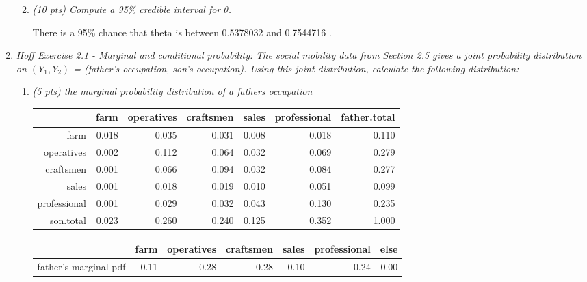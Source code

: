 \documentclass{article}\usepackage[]{graphicx}\usepackage[]{color}
\newenvironment{knitrout}{}{} %
\begin{document}
\begin{enumerate}
\begin{enumerate}
\begin{center}
\begin{knitrout}
\end{knitrout}
\end{center}

\item %
{\it (10 pts) Compute a 95\% credible interval for $\theta$. }

There is a 95\% chance that theta is between 0.5378032 and 0.7544716 .

\end{enumerate}
\newpage


\item %
{\it Hoff Exercise 2.1 - Marginal and conditional probability: The social mobility data from Section 2.5 gives a joint probability distribution on $(Y_{1}, Y_{2})$ = (father's occupation, son's occupation). Using this joint distribution, calculate the following distribution:



\begin{enumerate}
\item %
{\it (5 pts) the marginal probability distribution of a father\textsc{}s occupation}

\begin{table}[ht]
\centering
\begin{tabular}{rrrrrrr}
  \hline
 & farm & operatives & craftsmen & sales & professional & father.total \\ 
  \hline
farm & 0.018 & 0.035 & 0.031 & 0.008 & 0.018 & 0.110 \\ 
  operatives & 0.002 & 0.112 & 0.064 & 0.032 & 0.069 & 0.279 \\ 
  craftsmen & 0.001 & 0.066 & 0.094 & 0.032 & 0.084 & 0.277 \\ 
  sales & 0.001 & 0.018 & 0.019 & 0.010 & 0.051 & 0.099 \\ 
  professional & 0.001 & 0.029 & 0.032 & 0.043 & 0.130 & 0.235 \\ 
  son.total & 0.023 & 0.260 & 0.240 & 0.125 & 0.352 & 1.000 \\ 
   \hline
\end{tabular}
\end{table}
\begin{table}[ht]
\centering
\begin{tabular}{rrrrrrr}
  \hline
 & farm & operatives & craftsmen & sales & professional & else \\ 
  \hline
father's marginal pdf & 0.11 & 0.28 & 0.28 & 0.10 & 0.24 & 0.00 \\ 
   \hline
\end{tabular}
\end{table}




\end{enumerate}}
\end{enumerate}
\end{document}
